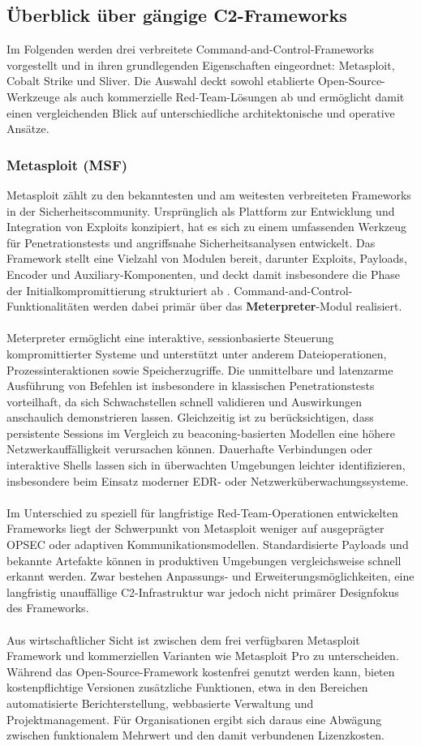 \subsection{Überblick über gängige C2-Frameworks}
Im Folgenden werden drei verbreitete Command-and-Control-Frameworks vorgestellt und in ihren grundlegenden Eigenschaften eingeordnet: Metasploit, Cobalt Strike und Sliver. 
Die Auswahl deckt sowohl etablierte Open-Source-Werkzeuge als auch kommerzielle Red-Team-Lösungen ab und ermöglicht damit einen vergleichenden Blick auf unterschiedliche architektonische und operative Ansätze.
\subsubsection{Metasploit (MSF)}
Metasploit zählt zu den bekanntesten und am weitesten verbreiteten Frameworks in der Sicherheitscommunity. 
Ursprünglich als Plattform zur Entwicklung und Integration von Exploits konzipiert, hat es sich zu einem umfassenden Werkzeug für Penetrationstests und angriffsnahe Sicherheitsanalysen entwickelt. 
Das Framework stellt eine Vielzahl von Modulen bereit, darunter Exploits, Payloads, Encoder und Auxiliary-Komponenten, und deckt damit insbesondere die Phase der Initialkompromittierung strukturiert ab \cite{msf_module}. 
Command-and-Control-Funktionalitäten werden dabei primär über das \textbf{Meterpreter}-Modul realisiert.
\\\\
Meterpreter ermöglicht eine interaktive, sessionbasierte Steuerung kompromittierter Systeme und unterstützt unter anderem Dateioperationen, Prozessinteraktionen sowie Speicherzugriffe. 
Die unmittelbare und latenzarme Ausführung von Befehlen ist insbesondere in klassischen Penetrationstests vorteilhaft, da sich Schwachstellen schnell validieren und Auswirkungen anschaulich demonstrieren lassen. 
Gleichzeitig ist zu berücksichtigen, dass persistente Sessions im Vergleich zu beaconing-basierten Modellen eine höhere Netzwerkauffälligkeit verursachen können. 
Dauerhafte Verbindungen oder interaktive Shells lassen sich in überwachten Umgebungen leichter identifizieren, insbesondere beim Einsatz moderner EDR- oder Netzwerküberwachungssysteme.
\\\\
Im Unterschied zu speziell für langfristige Red-Team-Operationen entwickelten Frameworks liegt der Schwerpunkt von Metasploit weniger auf ausgeprägter OPSEC oder adaptiven Kommunikationsmodellen. 
Standardisierte Payloads und bekannte Artefakte können in produktiven Umgebungen vergleichsweise schnell erkannt werden. 
Zwar bestehen Anpassungs- und Erweiterungsmöglichkeiten, eine langfristig unauffällige C2-Infrastruktur war jedoch nicht primärer Designfokus des Frameworks.
\\\\
Aus wirtschaftlicher Sicht ist zwischen dem frei verfügbaren Metasploit Framework und kommerziellen Varianten wie Metasploit Pro zu unterscheiden. 
Während das Open-Source-Framework kostenfrei genutzt werden kann, bieten kostenpflichtige Versionen zusätzliche Funktionen, etwa in den Bereichen automatisierte Berichterstellung, webbasierte Verwaltung und Projektmanagement. 
Für Organisationen ergibt sich daraus eine Abwägung zwischen funktionalem Mehrwert und den damit verbundenen Lizenzkosten.
